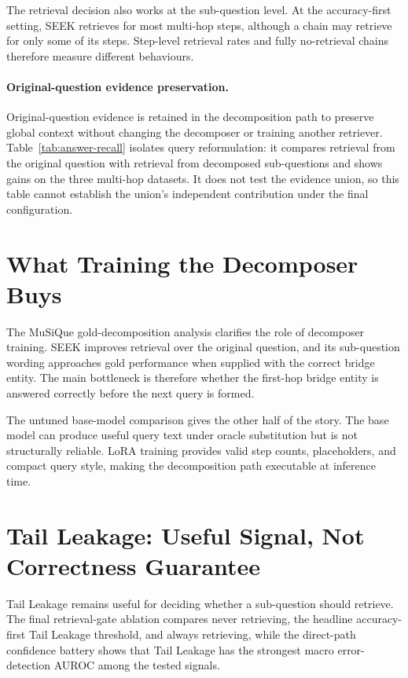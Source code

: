 The retrieval decision also works at the sub-question level. At the accuracy-first setting, SEEK retrieves for most multi-hop steps, although a chain may retrieve for only some of its steps. Step-level retrieval rates and fully no-retrieval chains therefore measure different behaviours.

\paragraph{Original-question evidence preservation.} Original-question evidence is retained in the decomposition path to preserve global context without changing the decomposer or training another retriever. Table~\ref{tab:answer-recall} isolates query reformulation: it compares retrieval from the original question with retrieval from decomposed sub-questions and shows gains on the three multi-hop datasets. It does not test the evidence union, so this table cannot establish the union's independent contribution under the final configuration.

\section{What Training the Decomposer Buys}
\label{sec:decomposer-training-discussion}

The MuSiQue gold-decomposition analysis clarifies the role of decomposer training. SEEK improves retrieval over the original question, and its sub-question wording approaches gold performance when supplied with the correct bridge entity. The main bottleneck is therefore whether the first-hop bridge entity is answered correctly before the next query is formed.

The untuned base-model comparison gives the other half of the story. The base model can produce useful query text under oracle substitution but is not structurally reliable. LoRA training provides valid step counts, placeholders, and compact query style, making the decomposition path executable at inference time.

\section{Tail Leakage: Useful Signal, Not Correctness Guarantee}
\label{sec:gate-design}

Tail Leakage remains useful for deciding whether a sub-question should retrieve. The final retrieval-gate ablation compares never retrieving, the headline accuracy-first Tail Leakage threshold, and always retrieving, while the direct-path confidence battery shows that Tail Leakage has the strongest macro error-detection AUROC among the tested signals.

